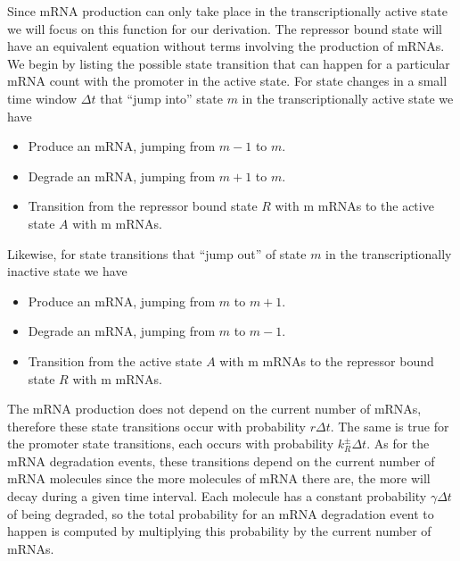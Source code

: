 Since mRNA production can only take place in the transcriptionally active state
we will focus on this function for our derivation. The repressor bound state
will have an equivalent equation without terms involving the production of
mRNAs. We begin by listing the possible state transition that can happen for a
particular mRNA count with the promoter in the active state. For state changes
in a small time window $\Delta t$ that ``jump into'' state $m$ in the
transcriptionally active state we have
\begin{itemize}
    \item Produce an mRNA, jumping from $m-1$ to $m$.
    \item Degrade an mRNA, jumping from $m+1$ to $m$.
    \item Transition from the repressor bound state $R$ with m mRNAs  to the active state $A$
    with m mRNAs.
\end{itemize}
Likewise, for state transitions that ``jump out'' of state $m$ in the
transcriptionally inactive state we have
\begin{itemize}
    \item Produce an mRNA, jumping from $m$ to $m+1$.
    \item Degrade an mRNA, jumping from $m$ to $m-1$.
    \item Transition from the active state $A$ with m mRNAs to the repressor bound state $R$ with
    m mRNAs.
\end{itemize}
The mRNA production does not depend on the current number of mRNAs, therefore
these state transitions occur with probability $r\Delta t$. The same is true
for the promoter state transitions, each occurs with probability $k_R^\pm \Delta
t$. As for the mRNA degradation events, these transitions depend on the current number of
mRNA molecules since the more molecules of mRNA there are, the more will decay during
a given time interval. Each molecule has a constant probability $\gamma \Delta t$ of 
being degraded, so the total probability for an mRNA degradation event to happen
is computed by multiplying this probability by the current number of mRNAs.

